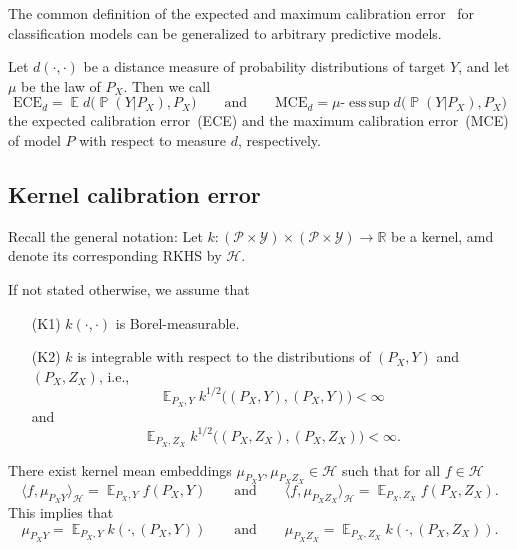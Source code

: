 \documentclass{article}
\DeclareMathOperator{\Prob}{\mathbb{P}}
\DeclareMathOperator{\Exp}{\mathbb{E}}
\DeclareMathOperator*{\esssup}{ess\,sup}
\begin{document}
The common definition of the expected and maximum calibration error~\citep{Naeini2015,Guo2017,Vaicenavicius2019,Kull2019}
for classification models can be generalized to arbitrary predictive
models.

\begin{definition}\label{def:ece_mce}
Let $d(\cdot, \cdot)$ be a distance measure of probability distributions
of target $Y$, and let $\mu$ be the law of $P_X$. Then we call
\begin{equation*}
    \mathrm{ECE}_d = \Exp d\big(\Prob(Y|P_X), P_X\big) \qquad \text{and} \qquad
    \mathrm{MCE}_d = \mu\text{-}\esssup d\big(\Prob(Y|P_X), P_X\big)
\end{equation*}
the expected calibration error~(ECE) and the maximum calibration error~(MCE)
of model $P$ with respect to measure $d$, respectively.
\end{definition}

\subsection{Kernel calibration error}

Recall the general notation: Let
$k \colon (\mathcal{P} \times \mathcal{Y}) \times (\mathcal{P} \times \mathcal{Y}) \to \mathbb{R}$
be a kernel, amd denote its corresponding RKHS by $\mathcal{H}$.

If not stated otherwise, we assume that
\begin{itemize}
    \item[(K1)] $k(\cdot, \cdot)$ is Borel-measurable.
    \item[(K2)] $k$ is integrable with respect to the distributions
    of $(P_X,Y)$ and $(P_X,Z_X)$, i.e.,
    \begin{equation*}
    \Exp_{P_X,Y} k^{1/2}\big((P_X, Y), (P_X, Y)\big) < \infty
    \end{equation*}
    and
    \begin{equation*}
    \Exp_{P_X,Z_X} k^{1/2}\big((P_X, Z_X), (P_X, Z_X)\big) < \infty.
    \end{equation*}
\end{itemize}

\begin{lemma}\label{lemma:mean_embedding}
There exist kernel mean embeddings
$\mu_{P_X Y}, \mu_{P_X Z_X} \in \mathcal{H}$
such that for all $f \in \mathcal{H}$
\begin{equation*}
    \langle f, \mu_{P_X Y} \rangle_{\mathcal{H}} = \Exp_{P_X,Y} f(P_X, Y) \qquad \text{and} \qquad    
    \langle f, \mu_{P_X Z_X} \rangle_{\mathcal{H}} = \Exp_{P_X,Z_X} f(P_X, Z_X).
\end{equation*}
This implies that
\begin{equation*}
    \mu_{P_X Y} = \Exp_{P_X,Y} k(\cdot, (P_X, Y)) \qquad \text{and} \qquad
    \mu_{P_X Z_X} = \Exp_{P_X,Z_X} k(\cdot, (P_X, Z_X)).
\end{equation*}
\end{lemma}
\end{document}
